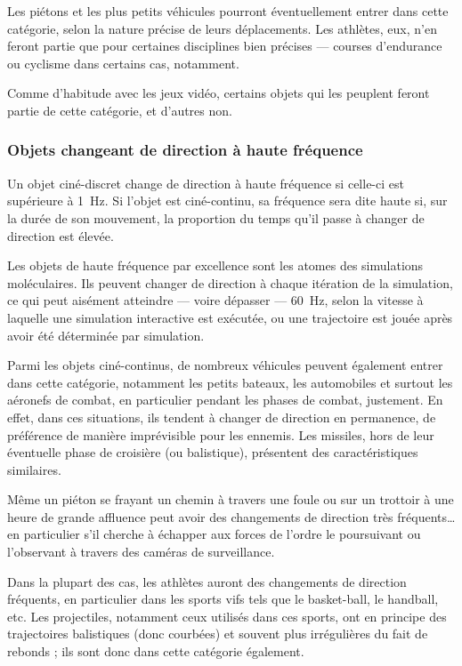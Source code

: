 	Les piétons et les plus petits véhicules pourront éventuellement entrer dans cette catégorie, selon la nature précise de leurs déplacements. Les athlètes, eux, n'en feront partie que pour certaines disciplines bien précises --- courses d'endurance ou cyclisme dans certains cas, notamment.
	
	Comme d'habitude avec les jeux vidéo, certains objets qui les peuplent feront partie de cette catégorie, et d'autres non.
	
	\FloatBarrier \subsubsection{Objets changeant de direction à haute fréquence}
	Un objet ciné-discret change de direction à haute fréquence si celle-ci est supérieure à 1~Hz. Si l'objet est ciné-continu, sa fréquence sera dite haute si, sur la durée de son mouvement, la proportion du temps qu'il passe à changer de direction est élevée.
	
	Les objets de haute fréquence par excellence sont les atomes des simulations moléculaires. Ils peuvent changer de direction à chaque itération de la simulation, ce qui peut aisément atteindre --- voire dépasser --- 60~Hz, selon la vitesse à laquelle une simulation interactive est exécutée, ou une trajectoire est jouée après avoir été déterminée par simulation.
	
	Parmi les objets ciné-continus, de nombreux véhicules peuvent également entrer dans cette catégorie, notamment les petits bateaux, les automobiles et surtout les aéronefs de combat, en particulier pendant les phases de combat, justement. En effet, dans ces situations, ils tendent à changer de direction en permanence, de préférence de manière imprévisible pour les ennemis. Les missiles, hors de leur éventuelle phase de croisière (ou balistique), présentent des caractéristiques similaires.
	
	Même un piéton se frayant un chemin à travers une foule ou sur un trottoir à une heure de grande affluence peut avoir des changements de direction très fréquents\ldots{} en particulier s'il cherche à échapper aux forces de l'ordre le poursuivant ou l'observant à travers des caméras de surveillance.
	
	Dans la plupart des cas, les athlètes auront des changements de direction fréquents, en particulier dans les sports \og vifs \fg{} tels que le basket-ball, le handball, etc.	Les projectiles, notamment ceux utilisés dans ces sports, ont en principe des trajectoires balistiques (donc courbées) et souvent plus irrégulières du fait de rebonds ; ils sont donc dans cette catégorie également.
	
